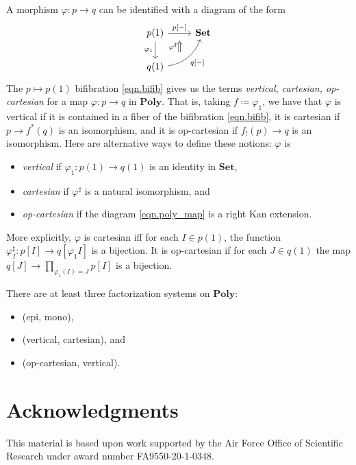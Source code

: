 \documentclass[11pt, one side, article]{memoir}
\theoremstyle{definition}
\theoremstyle{plain}
\newcommand{\Cat}[1]{\mathbf{#1}}%
\newcommand{\smset}{\Cat{Set}}
\newcommand{\poly}{\Cat{Poly}}
\newcommand{\0}{\textsf{0}}
\newcommand{\1}{\tn{\textsf{1}}}
\begin{document}
A morphism $\varphi\colon p\to q$ can be identified with a diagram of the form
\begin{equation}\label{eqn.poly_map}
\begin{tikzcd}
	p(1)\ar[d, "\varphi_1"']\ar[r, "{p[-]}", ""' name=p]&
	\smset\\
	q(1)\ar[ur, bend right, "{q[-]}"', "" name=q]
	\ar[to=p, from=q-|p, Rightarrow, shorten=3pt, "\varphi^\sharp"]
\end{tikzcd}
\end{equation}
The $p\mapsto p(1)$ bifibration \eqref{eqn.bifib} gives us the terms \emph{vertical, cartesian,  op-cartesian} for a map $\varphi\colon p\to q$ in $\poly$. That is, taking $f\coloneqq\varphi_1$, we have that $\varphi$ is vertical if it is contained in a fiber of the bifibration \eqref{eqn.bifib}, it is cartesian if $p\to f^*(q)$ is an isomorphism, and it is op-cartesian if $f_!(p)\to q$ is an isomorphism. Here are alternative ways to define these notions: $\varphi$ is 
\begin{itemize}
	\item \emph{vertical} if $\varphi_1\colon p(1)\to q(1)$ is an identity in $\smset$,
	\item \emph{cartesian} if $\varphi^\sharp$ is a natural isomorphism, and
	\item \emph{op-cartesian} if the diagram \eqref{eqn.poly_map} is a right Kan extension.
\end{itemize}
More explicitly, $\varphi$ is cartesian iff for each $I\in p(1)$, the function $\varphi^\sharp_I\colon p[I]\to q[\varphi_1I]$ is a bijection. It is op-cartesian if for each $J\in q(1)$ the map $q[J]\to\prod\limits_{\varphi_1(I)=J}p[I]$ is a bijection.

There are at least three factorization systems on $\poly$:
\begin{itemize}
	\item (epi, mono),
	\item (vertical, cartesian), and
	\item (op-cartesian, vertical).
\end{itemize}


\section*{Acknowledgments}
This material is based upon work supported by the Air Force Office of Scientific Research under award number FA9550-20-1-0348.

\printbibliography 
\end{document}
